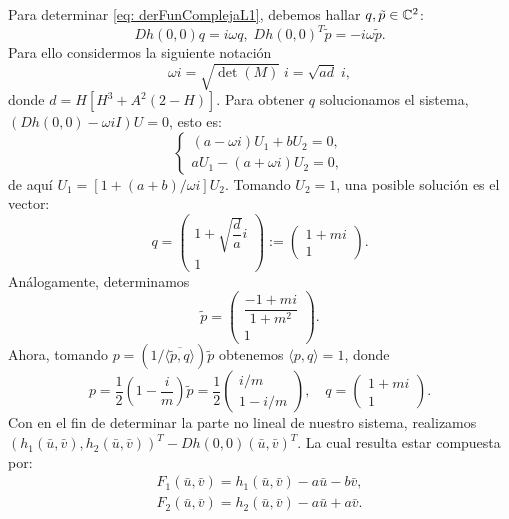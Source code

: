 \noindent Para determinar \eqref{eq: derFunComplejaL1}, debemos hallar $q,\tilde{p} \in {\mathbb{C}}^2$: $$Dh(0,0)q=i\omega q, \; Dh(0,0)^T \tilde{p}=-i\omega \tilde{p}.$$ Para ello considermos la siguiente notación $$\omega i= \sqrt{\det (M)} \; i = \sqrt{ad} \; i,$$ donde $d = H[H^3+A^2(2-H)]$. Para obtener $q$ solucionamos el sistema, $(Dh(0, 0) - \omega i I)U = 0$, esto es:
\begin{equation}
	\begin{cases}
	    (a - \omega i)U_1 + b U_2 = 0,\\
		a U_1 - (a + \omega i)U_2 = 0,
	\end{cases}
	\label{eq: VectoresPropiosOmega}
\end{equation}
de aquí $U_1 = [1 + (a+b)/\omega i]U_2$. Tomando $U_2 = 1$, una posible solución es el vector:
\begin{equation}
	q = 
	\begin{pmatrix}
		1 + \sqrt{\dfrac{d}{a}}i \\
		1 
	\end{pmatrix} 
	:=
	\begin{pmatrix}
		1 +mi\\
		1 
	\end{pmatrix}.
\end{equation}
Análogamente, determinamos
\begin{equation*}
\tilde{p} =
\begin{pmatrix}
	\dfrac{-1+mi}{1+m^2}\\
	1
\end{pmatrix}.
\end{equation*}
Ahora, tomando $p=(1/\overline{\langle \tilde{p},q \rangle})\tilde{p}$ obtenemos $\langle p,q \rangle =1$, donde
\begin{equation}
	p = \dfrac{1}{2}\left( 1-\dfrac{i}{m}\right) \tilde{p}
	= \dfrac{1}{2}
	\begin{pmatrix}
		i/m\\
		1 - i/m
	\end{pmatrix}, \quad
	q =
	\begin{pmatrix}
		1+mi\\
		1
	\end{pmatrix}.
	\label{eq: vecComplejos}
\end{equation}
Con en el fin de determinar la parte no lineal de nuestro sistema, realizamos \linebreak $(h_1(\bar{u}, \bar{v}),h_2(\bar{u}, \bar{v}))^T - Dh(0,0)(\bar{u},\bar{v})^T$. La cual resulta estar compuesta por:
\begin{equation}
	\begin{aligned}
		F_1(\bar{u}, \bar{v}) = h_1(\bar{u}, \bar{v}) - a\bar{u} - b\bar{v},\\
		F_2(\bar{u}, \bar{v}) = h_2(\bar{u}, \bar{v}) - a\bar{u} + a\bar{v}.
	\end{aligned}
\end{equation}
